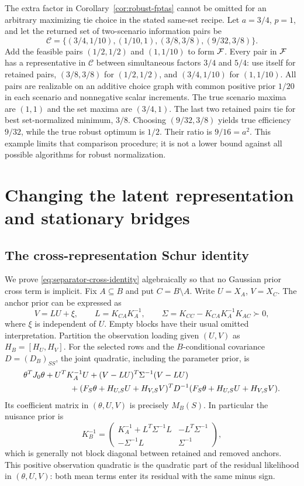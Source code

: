The extra factor in Corollary~\ref{cor:robust-fptas} cannot be omitted for
an arbitrary maximizing tie choice in the stated same-set recipe. Let
$a=3/4$, $p=1$, and let the returned set of two-scenario information pairs be
\[
 \mathcal C=\{(3/4,1/10),(1/10,1),(3/8,3/8),(9/32,3/8)\}.
\]
Add the feasible pairs $(1/2,1/2)$ and $(1,1/10)$ to form $\mathcal F$.
Every pair in $\mathcal F$ has a representative in $\mathcal C$ between
simultaneous factors $3/4$ and $5/4$: use itself for retained pairs,
$(3/8,3/8)$ for $(1/2,1/2)$, and $(3/4,1/10)$ for $(1,1/10)$.
All pairs are realizable on an additive choice graph with common positive
prior $1/20$ in each scenario and nonnegative scalar increments.
The true scenario maxima are $(1,1)$ and the set maxima are $(3/4,1)$.
The last two retained pairs tie for best set-normalized minimum, $3/8$.
Choosing $(9/32,3/8)$ yields true efficiency $9/32$, while the true robust
optimum is $1/2$. Their ratio is $9/16=a^2$.
This example limits that comparison procedure; it is not a lower bound
against all possible algorithms for robust normalization.

\section{Changing the latent representation and stationary bridges}
\label{app:separator-hierarchy}

\subsection{The cross-representation Schur identity}
We prove \eqref{eq:separator-cross-identity} algebraically so that no Gaussian
prior cross term is implicit. Fix $A\subseteq B$ and put $C=B\setminus A$.
Write $U=X_A$, $V=X_C$. The anchor prior can be expressed as
\[
 V=L U+\xi,\qquad L=K_{CA}K_A^{-1},\qquad
 \Sigma=K_{CC}-K_{CA}K_A^{-1}K_{AC}\succ0,
\]
where $\xi$ is independent of $U$. Empty blocks have their usual omitted
interpretation. Partition the observation loading given $(U,V)$ as
$H_B=[H_U,H_V]$. For the selected rows and the $B$-conditional covariance
$D=(D_B)_{SS}$, the joint quadratic, including the parameter prior, is
\begin{align}\label{eq:anchor-joint-quadratic}
 &\theta^TJ_0\theta+U^TK_A^{-1}U
 +(V-LU)^T\Sigma^{-1}(V-LU)\nonumber\\
 &\hspace{20mm}+(F_S\theta+H_{U,S}U+H_{V,S}V)^T
 D^{-1}(F_S\theta+H_{U,S}U+H_{V,S}V).
\end{align}
Its coefficient matrix in $(\theta,U,V)$ is precisely $M_B(S)$.
In particular the nuisance prior is
\[
 K_B^{-1}=\begin{pmatrix}
 K_A^{-1}+L^T\Sigma^{-1}L&-L^T\Sigma^{-1}\\
 -\Sigma^{-1}L&\Sigma^{-1}
 \end{pmatrix},
\]
which is generally not block diagonal between retained and removed anchors.
This positive observation quadratic is the quadratic part of the residual
likelihood in $(\theta,U,V)$: both mean terms enter its residual with the
same minus sign.

